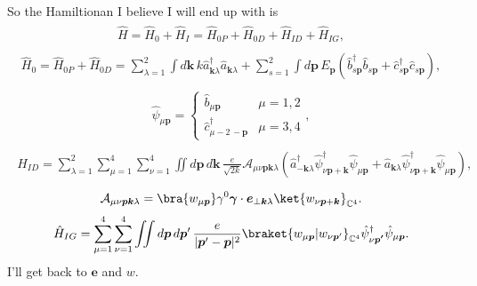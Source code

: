 \documentclass{report}
\begin{document}
So the Hamiltionan I believe I will end up with is
\begin{align}
\begin{aligned}
	\hat H = \hat H_{0} + \hat H_{I} = \hat H_{0 P} + \hat H_{0 D} + \hat H_{I D} + \hat H_{I G},
\end{aligned}
\end{align}
\begin{align}
\begin{aligned}
	\hat H_{0} = \hat H_{0 P} + \hat H_{0 D} = 
		\sum_{\lambda=1}^2 \int d\boldsymbol{k}\, k
			\hat a^\dagger_{\boldsymbol{k}\lambda} \hat a_{\boldsymbol{k}\lambda} + 
		\sum_{s=1}^2 \int d\boldsymbol{p}\, E_{\boldsymbol{p}} (
			\hat b^\dagger_{s \boldsymbol{p}} \hat b_{s \boldsymbol{p}} + 
			\hat c^\dagger_{s \boldsymbol{p}} \hat c_{s \boldsymbol{p}}
		),
	\label{H_0_03}
\end{aligned}
\end{align}
\begin{align}
\begin{aligned}
	\hat \psi_{\mu \boldsymbol{p}} = 
		\begin{cases}
			\hat b_{\mu \boldsymbol{p}} & \mu=1,2\\
			\hat c^\dagger_{\mu-2\, -\boldsymbol{p}} & \mu=3,4
		\end{cases},
\end{aligned}
\end{align}
\begin{align}
\begin{aligned}
	\hat H_{I D} = \sum_{\lambda=1}^2 \sum_{\mu=1}^4\sum_{\nu=1}^4 \iint d\boldsymbol{p}\, d\boldsymbol{k}\, 
		\frac{e}{\sqrt{2 k}} \mathcal{A}_{\mu \nu \boldsymbol{p} \boldsymbol{k} \lambda} (
			\hat a^\dagger_{-\boldsymbol{k} \lambda}	
				\hat \psi^\dagger_{\nu \boldsymbol{p} + \boldsymbol{k}} \hat \psi_{\mu \boldsymbol{p}} +
			\hat a_{\boldsymbol{k} \lambda}
				\hat \psi^\dagger_{\nu \boldsymbol{p} + \boldsymbol{k}} \hat \psi_{\mu \boldsymbol{p}}
		),
	\label{H_ID_03}
\end{aligned}
\end{align}
\begin{align}
\begin{aligned}
	\mathcal{A}_{\mu \nu \boldsymbol{p} \boldsymbol{k} \lambda} = 
		\bra{w_{\mu \boldsymbol{p}}}
		\gamma^0 \boldsymbol\gamma \cdot \boldsymbol{e}_{\perp \boldsymbol{k} \lambda}
		\ket{w_{\nu \boldsymbol{p} + \boldsymbol{k}}}_{\mathbb{C}^4}.
	\label{mathcal_A_04}
\end{aligned}
\end{align}
\begin{align}
\begin{aligned}
	\hat H_{I G} = \sum_{\mu=1}^4\sum_{\nu=1}^4 \iint d\boldsymbol{p}\, d\boldsymbol{p}'\, 
		\frac{e}{|\boldsymbol{p}' - \boldsymbol{p}|^2} 
		\braket{w_{\mu \boldsymbol{p}} | w_{\nu \boldsymbol{p}'}}_{\mathbb{C}^4}
		\hat \psi^\dagger_{\nu \boldsymbol{p'}} \hat \psi_{\mu \boldsymbol{p}}.
	\label{H_IG_03}
\end{aligned}
\end{align}
I'll get back to $\boldsymbol e$ and $w$.
\end{document}
